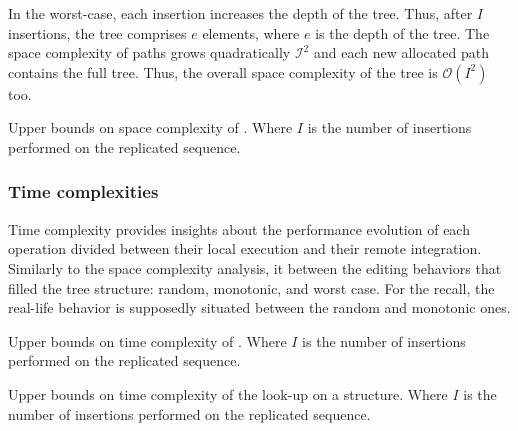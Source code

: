 In the worst-case, each insertion increases the depth of the tree. Thus, after
$I$ insertions, the tree comprises $e$ elements, where $e$ is the depth of the
tree. The space complexity of paths grows quadratically $\mathcal{I^2}$ and each
new allocated path contains the full tree. Thus, the overall space complexity of
the tree is $\mathcal{O}(I^2)$ too.

\begin{table}
  \centering
  
  \caption{\label{table:lseqspace}
    Upper bounds on space complexity of \LSEQ. Where $I$ is the number 
    of insertions performed on the replicated sequence.}
\end{table}


\subsubsection{Time complexities}

Time complexity provides insights about the performance evolution of each
operation divided between their local execution and their remote integration.
Similarly to the space complexity analysis, it  between the
editing behaviors that filled the tree structure: random, monotonic, and worst
case. For the recall, the real-life behavior is supposedly situated between the
random and monotonic ones. 

\begin{table}
  \centering
  
  \caption{\label{table:lseqtime}
    Upper bounds on time complexity of \LSEQ. Where $I$ is the number of 
    insertions performed on the replicated sequence.}
\end{table}



\begin{table}
  \centering
  
  \caption{\label{table:lseqlookup}
    Upper bounds on time complexity of the look-up on a \LSEQ structure.
    Where $I$ is the number of insertions performed on the replicated sequence.}
\end{table}

\subsubsection{}

